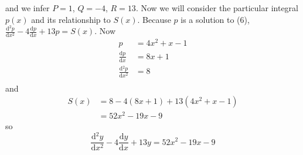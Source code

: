 \documentclass[10pt]{article}
\newcommand*{\dydx}[0]{\frac{\text{d}y}{\text{d}x}}
\newcommand*{\df}[2]{\frac{\text{d}{#1}}{\text{d}{#2}}}%
\begin{document}
\begin{enumerate}
            and we infer $P = 1$, $Q = -4$, $R = 13$. Now we will
            consider the particular integral $p(x)$ and its relationship to
            $S(x)$. Because $p$ is a solution to (6), $ \df{^2p}{x^2} - 4\df{p}{x} +13p = S(x).$
            Now
            \begin{align*}
                p &= 4x^2 + x - 1 \\
                \df{p}{x} &= 8x + 1 \\
                \df{^2p}{x^2} &= 8 \\
            \end{align*}
            and
            \begin{align*}
                S(x) &= 8 - 4(8x + 1) + 13(4x^2 + x - 1) \\
                &= 52 x^2 - 19 x - 9
            \end{align*}
            so
            $$
            \df{^2y}{x^2} - 4\dydx + 13y = 52 x^2 - 19 x - 9
            $$

    \end{enumerate}
\end{document}
